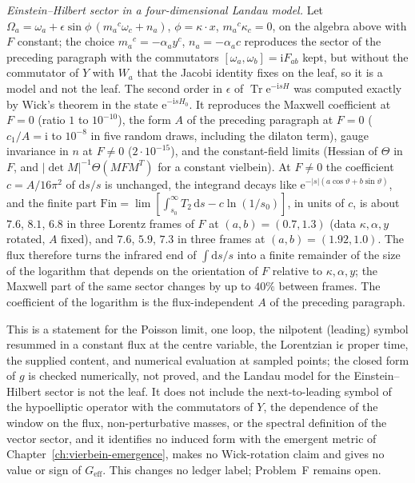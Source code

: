 \emph{Einstein--Hilbert sector in a four-dimensional Landau model.} Let \(\Omega_a=\omega_a+\epsilon\sin\phi\,(m_a{}^c\omega_c+n_a)\), \(\phi=\kappa\cdot x\), \(m_a{}^c\kappa_c=0\), on the algebra above with \(F\) constant; the choice \(m_a{}^c=-\alpha_ay^c\), \(n_a=-\alpha_a c\) reproduces the sector of the preceding paragraph with the commutators \([\omega_a,\omega_b]=\mathrm iF_{ab}\) kept, but without the commutator of \(Y\) with \(W_a\) that the Jacobi identity fixes on the leaf, so it is a model and not the leaf. The second order in \(\epsilon\) of \(\operatorname{Tr}\mathrm e^{-\mathrm isH}\) was computed exactly by Wick's theorem in the state \(\mathrm e^{-\mathrm isH_0}\). It reproduces the Maxwell coefficient at \(F=0\) (ratio \(1\) to \(10^{-10}\)), the form \(A\) of the preceding paragraph at \(F=0\) (\(c_1/A=\mathrm i\) to \(10^{-8}\) in five random draws, including the dilaton term), gauge invariance in \(n\) at \(F\ne0\) (\(2\cdot10^{-15}\)), and the constant-field limits (Hessian of \(\Theta\) in \(F\), and \(|\det M|^{-1}\Theta(MFM^T)\) for a constant vielbein). At \(F\ne0\) the coefficient \(c=A/16\pi^2\) of \(\mathrm ds/s\) is unchanged, the integrand decays like \(\mathrm e^{-|s|(a\cos\vartheta+b\sin\vartheta)}\), and the finite part \(\mathrm{Fin}=\lim[\int_{s_0}^\infty T_2\,\mathrm ds-c\ln(1/s_0)]\), in units of \(c\), is about \(7.6\), \(8.1\), \(6.8\) in three Lorentz frames of \(F\) at \((a,b)=(0.7,1.3)\) (data \(\kappa,\alpha,y\) rotated, \(A\) fixed), and \(7.6\), \(5.9\), \(7.3\) in three frames at \((a,b)=(1.92,1.0)\). The flux therefore turns the infrared end of \(\int\mathrm ds/s\) into a finite remainder of the size of the logarithm that depends on the orientation of \(F\) relative to \(\kappa,\alpha,y\); the Maxwell part of the same sector changes by up to \(40\%\) between frames. The coefficient of the logarithm is the flux-independent \(A\) of the preceding paragraph.

This is a statement for the Poisson limit, one loop, the nilpotent (leading) symbol resummed in a constant flux at the centre variable, the Lorentzian \(\mathrm i\epsilon\) proper time, the supplied content, and numerical evaluation at sampled points; the closed form of \(g\) is checked numerically, not proved, and the Landau model for the Einstein--Hilbert sector is not the leaf. It does not include the next-to-leading symbol of the hypoelliptic operator with the commutators of \(Y\), the dependence of the window on the flux, non-perturbative masses, or the spectral definition of the vector sector, and it identifies no induced form with the emergent metric of Chapter~\ref{ch:vierbein-emergence}, makes no Wick-rotation claim and gives no value or sign of \(G_{\mathrm{eff}}\). This changes no ledger label; Problem~F remains open.
